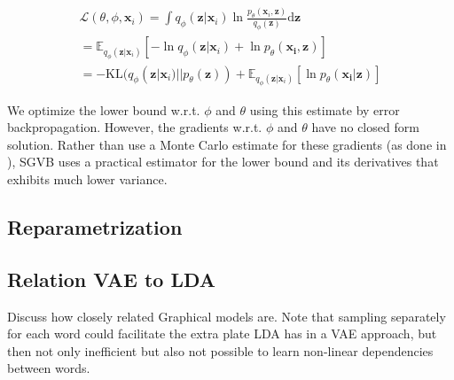 \documentclass{report}
\begin{document}
\begin{align}
\mathcal{L}(\theta, \phi, \mathbf{x}_i) = \int q_\phi(\mathbf{z}|\mathbf{x}_i) \ln \frac{p_\theta(\mathbf{x}_i,\mathbf{{z}})}{q_\phi(\mathbf{z})}\text{d}\mathbf{z} \\
= \mathbb{E}_{q_\phi(\mathbf{z}|\mathbf{x}_i)}[-\ln q_\phi (\mathbf{z}|\mathbf{x}_i)+\ln p_\theta (\mathbf{x_i,z})] \\
= -\text{KL}(q_\phi(\mathbf{z}|\mathbf{x}_i)||p_\theta(\mathbf{{z}})) + \mathbb{E}_{q_\phi(\mathbf{z}|\mathbf{x}_i)}[\ln p_\theta (\mathbf{x_i|z})]
\end{align}

We optimize the lower bound w.r.t. $\phi$ and $\theta$ using this estimate by error backpropagation. However, the gradients w.r.t. $\phi$ and $\theta$ have no closed form solution. Rather than use a Monte Carlo estimate for these gradients (as done in \cite{paisley2012variational}), SGVB uses a practical estimator for the lower bound and its derivatives that exhibits much lower variance.  

\subsection{Reparametrization}\label{reparametrization}

\subsection{Relation VAE to LDA}

Discuss how closely related Graphical models are. Note that sampling separately for each word could facilitate the extra plate LDA has in a VAE approach, but then not only inefficient but also not possible to learn non-linear dependencies between words.
\end{document}
